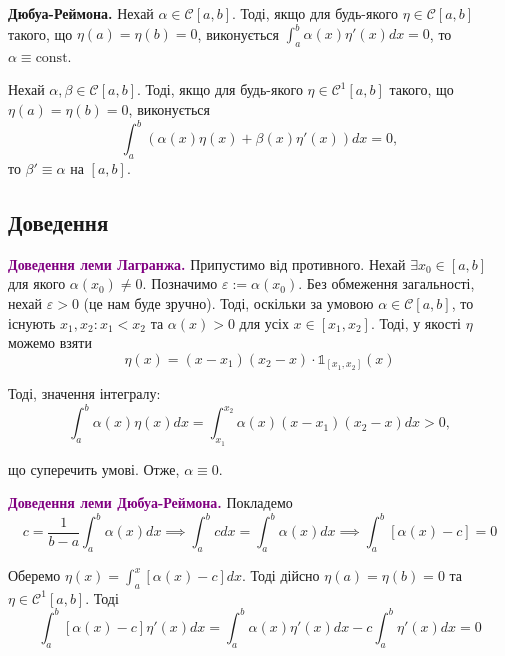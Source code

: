 \documentclass[14pt]{extarticle}
\newcommand{\<}{\langle}
\renewcommand{\>}{\rangle}
\theoremstyle{mystyle}{\newtheorem{definition}{Definition}[section]}
\theoremstyle{mystyle}{\newtheorem{proposition}[definition]{Proposition}}
\theoremstyle{mystyle}{\newtheorem{theorem}[definition]{Theorem}}
\theoremstyle{mystyle}{\newtheorem{lemma}[definition]{Lemma}}
\theoremstyle{mystyle}{\newtheorem{corollary}[definition]{Corollary}}
\theoremstyle{mystyle}{\newtheorem*{remark}{Remark}}
\theoremstyle{mystyle}{\newtheorem*{remarks}{Remarks}}
\theoremstyle{mystyle}{\newtheorem*{example}{Example}}
\theoremstyle{mystyle}{\newtheorem*{examples}{Examples}}
\theoremstyle{definition}{\newtheorem*{exercise}{Exercise}}
\theoremstyle{cstyle}{\newtheorem*{cthm}{}}
\theoremstyle{warn}
\begin{document}
\begin{lemma}\textbf{Дюбуа-Реймона.} Нехай $\alpha \in \mathcal{C}[a,b]$. Тоді, якщо для будь-якого $\eta \in \mathcal{C}[a,b]$ такого, що $\eta(a)=\eta(b)=0$, виконується $\int_a^b \alpha(x)\eta'(x)dx=0$, то $\alpha \equiv \text{const}$.
\end{lemma}

\begin{lemma} Нехай $\alpha,\beta \in \mathcal{C}[a,b]$. Тоді, якщо для будь-якого $\eta \in \mathcal{C}^1[a,b]$ такого, що $\eta(a)=\eta(b)=0$, виконується 
\begin{equation}
    \int_a^b (\alpha(x)\eta(x) + \beta(x)\eta'(x))dx=0,
\end{equation}
то $\beta' \equiv \alpha$ на $[a,b]$.
\end{lemma}

\subsection{Доведення}

\textcolor{purple}{\textbf{Доведення леми Лагранжа.}} Припустимо від противного. Нехай $\exists x_0 \in [a,b]$ для якого 
$\alpha(x_0) \neq 0$. Позначимо $\varepsilon := \alpha(x_0)$. Без обмеження загальності, нехай
$\varepsilon > 0$ (це нам буде зручно). Тоді, оскільки за умовою $\alpha \in \mathcal{C}[a,b]$, то
існують $x_1,x_2: x_1<x_2$ та $\alpha(x)>0$ для усіх $x \in [x_1,x_2]$. Тоді, у якості $\eta$ можемо взяти
\begin{equation}
    \eta(x) = (x-x_1)(x_2-x) \cdot \mathds{1}_{[x_1,x_2]}(x)
\end{equation}

Тоді, значення інтегралу:
\begin{equation}
    \int_a^b \alpha(x)\eta(x)dx = \int_{x_1}^{x_2}\alpha(x)(x-x_1)(x_2-x)dx > 0,
\end{equation}

що суперечить умові. Отже, $\alpha \equiv 0$.

\textcolor{purple}{\textbf{Доведення леми Дюбуа-Реймона.}} Покладемо
\begin{equation}
    c = \frac{1}{b-a}\int_a^b \alpha(x)dx \implies \int_a^b cdx = \int_a^b \alpha(x)dx \implies \int_a^b [\alpha(x) - c] = 0
\end{equation}

Оберемо $\eta(x)=\int_a^x [\alpha(x)-c]dx$. Тоді дійсно $\eta(a)=\eta(b)=0$ та $\eta \in \mathcal{C}^1[a,b]$. Тоді
\begin{equation}
    \int_a^b [\alpha(x)-c]\eta'(x)dx = \int_a^b \alpha(x)\eta'(x)dx - c\int_a^b \eta'(x)dx = 0
\end{equation}
\end{document}
